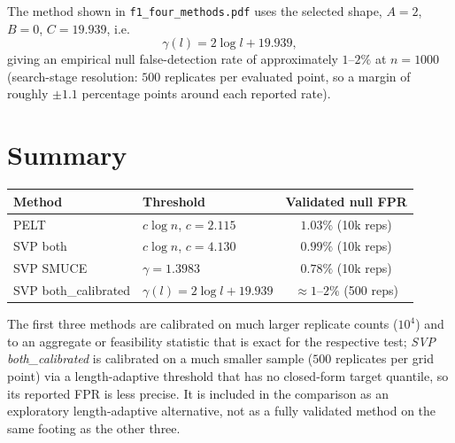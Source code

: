 \documentclass[11pt]{article}
\newcommand{\gam}{\gamma}
\begin{document}
The method shown in \texttt{f1\_four\_methods.pdf} uses the selected shape,
$A=2$, $B=0$, $C=19.939$, i.e.\
\[
\gam(l) = 2\log l + 19.939 ,
\]
giving an empirical null false-detection rate of approximately
$1$--$2\%$ at $n=1000$ (search-stage resolution: $500$ replicates per
evaluated point, so a margin of roughly $\pm 1.1$ percentage points around
each reported rate).

\section{Summary}

\begin{center}
\begin{tabular}{llc}
\toprule
Method & Threshold & Validated null FPR \\
\midrule
PELT & $c\log n$, $c=2.115$ & $1.03\%$ (10k reps) \\
SVP both & $c\log n$, $c=4.130$ & $0.99\%$ (10k reps) \\
SVP SMUCE & $\gam = 1.3983$ & $0.78\%$ (10k reps) \\
SVP both\_calibrated & $\gam(l)=2\log l + 19.939$ & $\approx 1$--$2\%$ (500 reps) \\
\bottomrule
\end{tabular}
\end{center}

The first three methods are calibrated on much larger replicate counts
($10^4$) and to an aggregate or feasibility statistic that is exact for the
respective test; \emph{SVP both\_calibrated} is calibrated on a much
smaller sample ($500$ replicates per grid point) via a length-adaptive
threshold that has no closed-form target quantile, so its reported FPR is
less precise. It is included in the comparison as an exploratory
length-adaptive alternative, not as a fully validated method on the same
footing as the other three.
\end{document}

